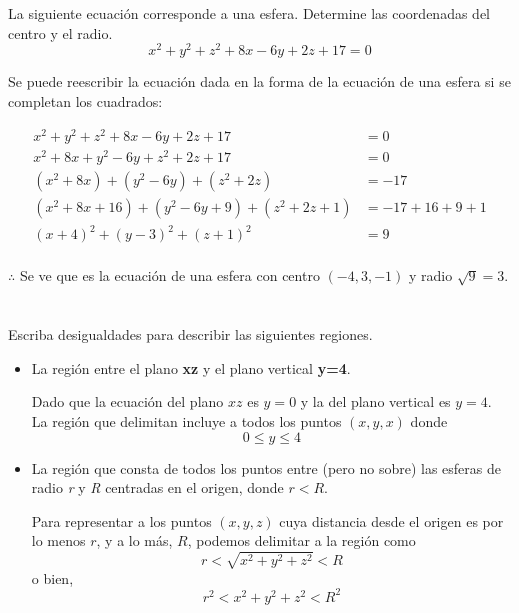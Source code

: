 \documentclass[12pt]{article}
\begin{document}
\section{}

La siguiente ecuación corresponde a una esfera. Determine las coordenadas del centro y el radio.
\[ x^2 + y^2 + z^2 + 8x - 6y + 2z + 17 = 0 \]

Se puede reescribir la ecuación dada en la forma de la ecuación de una esfera si se completan los cuadrados:

\begin{equation*}
  \begin{split}
    x^2 + y^2 + z^2 + 8x - 6y + 2z + 17 &= 0 \\
    x^2 + 8x + y^2 - 6y + z^2 + 2z + 17 &= 0 \\
    (x^2 + 8x) + (y^2 - 6y) + (z^2 + 2z) &= - 17 \\
    (x^2 + 8x + 16) + (y^2 - 6y + 9) + (z^2 + 2z + 1) &= - 17 + 16 + 9 + 1\\
    (x + 4)^2 + (y - 3)^2 + (z + 1)^2 &= 9 \\
  \end{split}
\end{equation*}

$\therefore $ Se ve que es la ecuación de una esfera con centro $(-4, 3, -1)$ y radio $\sqrt{9} = 3$.

\section{}

Escriba desigualdades para describir las siguientes regiones.

\begin{itemize}
    
\item La región entre el plano \textbf{xz} y el plano vertical \textbf{y=4}.

  Dado que la ecuación del plano $xz$ es $y=0$  y la del plano vertical es $y=4$. La región que delimitan incluye a todos los puntos $(x,y,x)$ donde
  $$0 \leq y \leq 4$$
    
\item La región que consta de todos los puntos entre (pero no sobre) las esferas de radio \textit{r} y \textit{R} centradas en el origen, donde $r < R$.

  Para representar a los puntos $(x,y,z)$ cuya distancia desde el origen es por lo menos $r$, y a lo más, $R$, podemos delimitar a la región como
  $$r < \sqrt{x^2 + y^2 + z^2} < R$$
  o bien,
  $$r^2 < x^2 + y^2 + z^2 < R^2$$
    
\end{itemize}
  
\end{document}
